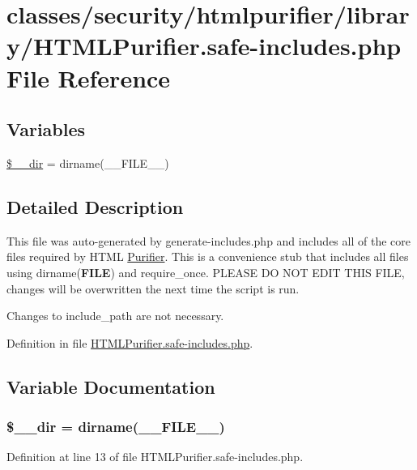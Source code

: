 \hypertarget{HTMLPurifier_8safe-includes_8php}{\section{classes/security/htmlpurifier/library/\+H\+T\+M\+L\+Purifier.safe-\/includes.php File Reference}
\label{HTMLPurifier_8safe-includes_8php}
}
\subsection*{Variables}
\begin{DoxyCompactItemize}
\item 
\hyperlink{HTMLPurifier_8safe-includes_8php_a677ca43b70d67e460cab488e976cec07}{\$\+\_\+\+\_\+dir} = dirname(\+\_\+\+\_\+\+F\+I\+L\+E\+\_\+\+\_\+)
\end{DoxyCompactItemize}


\subsection{Detailed Description}
This file was auto-\/generated by generate-\/includes.\+php and includes all of the core files required by H\+T\+M\+L \hyperlink{classPurifier}{Purifier}. This is a convenience stub that includes all files using dirname({\bfseries F\+I\+L\+E}) and require\+\_\+once. P\+L\+E\+A\+S\+E D\+O N\+O\+T E\+D\+I\+T T\+H\+I\+S F\+I\+L\+E, changes will be overwritten the next time the script is run.

Changes to include\+\_\+path are not necessary. 

Definition in file \hyperlink{HTMLPurifier_8safe-includes_8php_source}{H\+T\+M\+L\+Purifier.\+safe-\/includes.\+php}.



\subsection{Variable Documentation}
\hypertarget{HTMLPurifier_8safe-includes_8php_a677ca43b70d67e460cab488e976cec07}{
\subsubsection[{\$\+\_\+\+\_\+dir}]{\setlength{\rightskip}{0pt plus 5cm}\$\+\_\+\+\_\+dir = dirname(\+\_\+\+\_\+\+F\+I\+L\+E\+\_\+\+\_\+)}}\label{HTMLPurifier_8safe-includes_8php_a677ca43b70d67e460cab488e976cec07}


Definition at line 13 of file H\+T\+M\+L\+Purifier.\+safe-\/includes.\+php.

